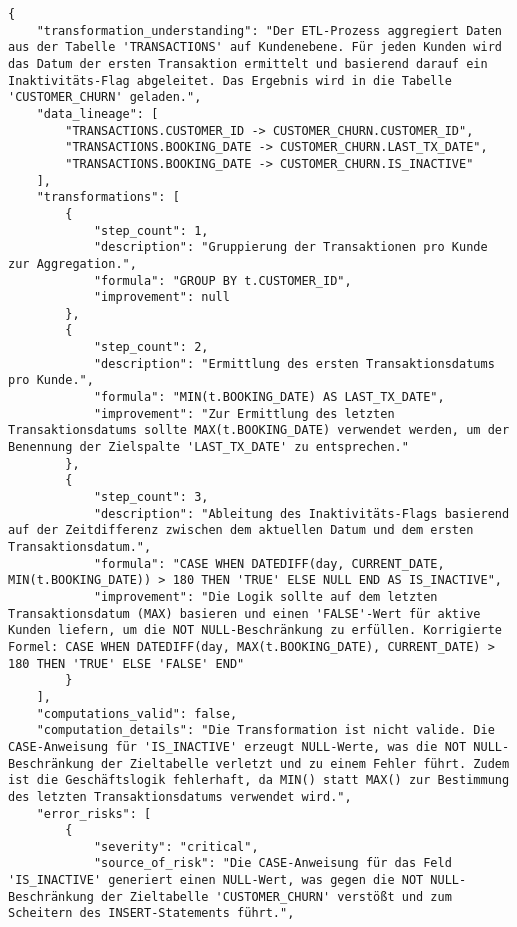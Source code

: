 \begin{lstlisting}[caption={Ausgabe: GEMINI 2.5 Pro Anwendungsfall 7 Konsistenzdurchlauf},label={gemini_case7_prompt2}]
{
    "transformation_understanding": "Der ETL-Prozess aggregiert Daten aus der Tabelle 'TRANSACTIONS' auf Kundenebene. Für jeden Kunden wird das Datum der ersten Transaktion ermittelt und basierend darauf ein Inaktivitäts-Flag abgeleitet. Das Ergebnis wird in die Tabelle 'CUSTOMER_CHURN' geladen.",
    "data_lineage": [
        "TRANSACTIONS.CUSTOMER_ID -> CUSTOMER_CHURN.CUSTOMER_ID",
        "TRANSACTIONS.BOOKING_DATE -> CUSTOMER_CHURN.LAST_TX_DATE",
        "TRANSACTIONS.BOOKING_DATE -> CUSTOMER_CHURN.IS_INACTIVE"
    ],
    "transformations": [
        {
            "step_count": 1,
            "description": "Gruppierung der Transaktionen pro Kunde zur Aggregation.",
            "formula": "GROUP BY t.CUSTOMER_ID",
            "improvement": null
        },
        {
            "step_count": 2,
            "description": "Ermittlung des ersten Transaktionsdatums pro Kunde.",
            "formula": "MIN(t.BOOKING_DATE) AS LAST_TX_DATE",
            "improvement": "Zur Ermittlung des letzten Transaktionsdatums sollte MAX(t.BOOKING_DATE) verwendet werden, um der Benennung der Zielspalte 'LAST_TX_DATE' zu entsprechen."
        },
        {
            "step_count": 3,
            "description": "Ableitung des Inaktivitäts-Flags basierend auf der Zeitdifferenz zwischen dem aktuellen Datum und dem ersten Transaktionsdatum.",
            "formula": "CASE WHEN DATEDIFF(day, CURRENT_DATE, MIN(t.BOOKING_DATE)) > 180 THEN 'TRUE' ELSE NULL END AS IS_INACTIVE",
            "improvement": "Die Logik sollte auf dem letzten Transaktionsdatum (MAX) basieren und einen 'FALSE'-Wert für aktive Kunden liefern, um die NOT NULL-Beschränkung zu erfüllen. Korrigierte Formel: CASE WHEN DATEDIFF(day, MAX(t.BOOKING_DATE), CURRENT_DATE) > 180 THEN 'TRUE' ELSE 'FALSE' END"
        }
    ],
    "computations_valid": false,
    "computation_details": "Die Transformation ist nicht valide. Die CASE-Anweisung für 'IS_INACTIVE' erzeugt NULL-Werte, was die NOT NULL-Beschränkung der Zieltabelle verletzt und zu einem Fehler führt. Zudem ist die Geschäftslogik fehlerhaft, da MIN() statt MAX() zur Bestimmung des letzten Transaktionsdatums verwendet wird.",
    "error_risks": [
        {
            "severity": "critical",
            "source_of_risk": "Die CASE-Anweisung für das Feld 'IS_INACTIVE' generiert einen NULL-Wert, was gegen die NOT NULL-Beschränkung der Zieltabelle 'CUSTOMER_CHURN' verstößt und zum Scheitern des INSERT-Statements führt.",

\end{lstlisting}
